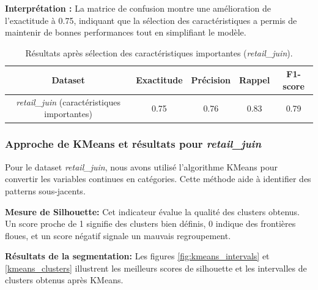 \textbf{Interprétation :} La matrice de confusion montre une amélioration de l'exactitude à 0.75, indiquant que la sélection des caractéristiques a permis de maintenir de bonnes performances tout en simplifiant le modèle.

\begin{table}[H]
    \centering
    \begin{tabular}{|c|c|c|c|c|}
        \hline
        \textbf{Dataset} & \textbf{Exactitude} & \textbf{Précision} & \textbf{Rappel} & \textbf{F1-score} \\
        \hline
        \textit{retail\_juin} (caractéristiques importantes) & 0.75 & 0.76 & 0.83 & 0.79 \\
        \hline
    \end{tabular}
    \caption{Résultats après sélection des caractéristiques importantes (\textit{retail\_juin}).}
\end{table}

\subsubsection{Approche de KMeans et résultats pour \textit{retail\_juin}}

Pour le dataset \textit{retail\_juin}, nous avons utilisé l'algorithme KMeans pour convertir les variables continues en catégories. Cette méthode aide à identifier des patterns sous-jacents.

\textbf{Mesure de Silhouette:} Cet indicateur évalue la qualité des clusters obtenus. Un score proche de 1 signifie des clusters bien définis, 0 indique des frontières floues, et un score négatif signale un mauvais regroupement.

\textbf{Résultats de la segmentation:} Les figures \ref{fig:kmeans_intervals} et \ref{kmeans_clusters} illustrent les meilleurs scores de silhouette et les intervalles de clusters obtenus après KMeans.

